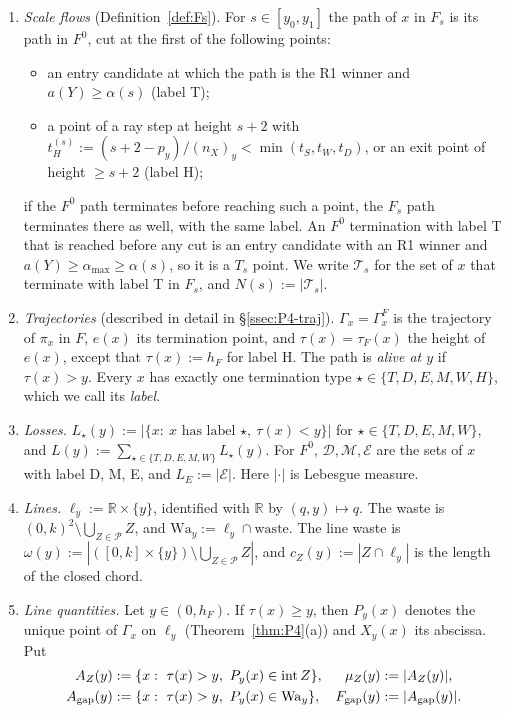 \documentclass[11pt]{amsart}
\newcommand{\R}{\mathbb R}
\newcommand{\cP}{\mathcal P}
\newcommand{\cD}{\mathcal D}
\newcommand{\cM}{\mathcal M}
\newcommand{\cE}{\mathcal E}
\newcommand{\cT}{\mathcal T}
\newcommand{\Fgap}{F_{\mathrm{gap}}}
\newcommand{\amax}{\alpha_{\max}}
\newcommand{\Fz}{F^{0}}
\newcommand{\Fs}{F_{s}}
\theoremstyle{definition}
\theoremstyle{remark}
\numberwithin{equation}{section}
\begin{document}
\begin{enumerate}[(N1)]
\item \emph{Scale flows} (Definition~\ref{def:Fs}). For $s\in[y_0,y_1]$ the path of $x$ in $\Fs$ is its path in $\Fz$, cut at the first of the following points:
 \begin{itemize}
 \item[($T_s$)] an entry candidate at which the path is the R1 winner and $a(Y)\ge\alpha(s)$ (label T);
 \item[($H_s$)] a point of a ray step at height $s+2$ with $t^{(s)}_H:=(s+2-p_y)/(n_X)_y<\min(t_S,t_W,t_D)$, or an exit point of height $\ge s+2$ (label H);
 \end{itemize}
 if the $\Fz$ path terminates before reaching such a point, the $\Fs$ path terminates there as well, with the same label. An $\Fz$ termination with label T that is reached before any cut is an entry candidate with an R1 winner and $a(Y)\ge\amax\ge\alpha(s)$, so it is a $T_s$ point. We write $\cT_s$ for the set of $x$ that terminate with label T in $\Fs$, and $N(s):=|\cT_s|$.
\item \emph{Trajectories} (described in detail in \S\ref{ssec:P4-traj}). $\Gamma_x=\Gamma^F_x$ is the trajectory of $\pi_x$ in $F$, $e(x)$ its termination point, and $\tau(x)=\tau_F(x)$ the height of $e(x)$, except that $\tau(x):=h_F$ for label H. The path is \emph{alive at $y$} if $\tau(x)>y$. Every $x$ has exactly one termination type $\star\in\{T,D,E,M,W,H\}$, which we call its \emph{label}.
\item \emph{Losses.} $L_\star(y):=|\{x:\ x\text{ has label }\star,\ \tau(x)<y\}|$ for $\star\in\{T,D,E,M,W\}$, and $L(y):=\sum_{\star\in\{T,D,E,M,W\}}L_\star(y)$. For $\Fz$, $\cD,\cM,\cE$ are the sets of $x$ with label D, M, E, and $L_E:=|\cE|$. Here $|\cdot|$ is Lebesgue measure.
\item \emph{Lines.} $\ell_y:=\R\times\{y\}$, identified with $\R$ by $(q,y)\mapsto q$. The waste is $(0,k)^2\setminus\bigcup_{Z\in\cP}Z$, and $\mathrm{Wa}_y:=\ell_y\cap\text{waste}$. The line waste is $\omega(y):=|([0,k]\times\{y\})\setminus\bigcup_{Z\in\cP}Z|$, and $c_Z(y):=|Z\cap\ell_y|$ is the length of the closed chord.
\item \emph{Line quantities.} Let $y\in(0,h_F)$. If $\tau(x)\ge y$, then $P_y(x)$ denotes the unique point of $\Gamma_x$ on $\ell_y$ (Theorem~\ref{thm:P4}(a)) and $X_y(x)$ its abscissa. Put
 \begin{align*}
 A_Z(y)&:=\{x:\ \tau(x)>y,\ P_y(x)\in\operatorname{int}Z\},& \mu_Z(y)&:=|A_Z(y)|,\\
 A_{\rm gap}(y)&:=\{x:\ \tau(x)>y,\ P_y(x)\in\mathrm{Wa}_y\},& \Fgap(y)&:=|A_{\rm gap}(y)|.

\end{align*}
\end{enumerate}
\end{document}
